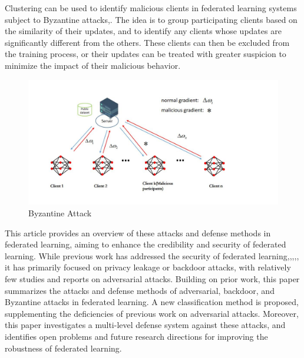 \documentclass[conference]{IEEEtran}
\begin{document}
Clustering can be used to identify malicious clients in federated learning systems subject to Byzantine attacks\cite{b35},\cite{b36}.
The idea is to group participating clients based on the similarity of their updates, and to identify any clients whose updates are significantly different from the others.
These clients can then be excluded from the training process, or their updates can be treated with greater suspicion to minimize the impact of their malicious behavior\cite{b37}.
\begin{figure}[htbp]
    \centerline{\includegraphics[width=0.8\linewidth,height=0.6\linewidth]{picture/f5.jpg}}
    \caption{Byzantine Attack}
    \label{fig5}
\end{figure}

This article provides an overview of these attacks and defense methods in federated learning, aiming to enhance the credibility and security of federated learning.
While previous work has addressed the security of federated learning\cite{b39},\cite{b40},\cite{b41},\cite{b42},\cite{b43}, it has primarily focused on privacy leakage or backdoor attacks,
with relatively few studies and reports on adversarial attacks. Building on prior work, this paper summarizes the attacks and defense methods of adversarial, backdoor,
and Byzantine attacks in federated learning. A new classification method is proposed, supplementing the deficiencies of previous work on adversarial attacks.
Moreover, this paper investigates a multi-level defense system against these attacks, and identifies open problems and future research directions for improving
the robustness of federated learning.
\end{document}
